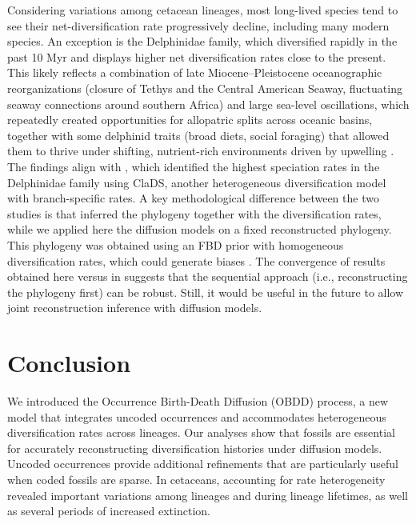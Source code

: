 \documentclass[oupdraft]{sysbio}
\newcommand{\revised}[1]{{\color{blue} #1}}
\begin{document}
Considering variations among cetacean lineages, most long-lived species tend to see their net-diversification rate progressively decline, including many modern species. An exception is the Delphinidae family, which diversified rapidly in the past 10 Myr and displays higher net diversification rates close to the present. This likely reflects a combination of late Miocene–Pleistocene oceanographic reorganizations (closure of Tethys and the Central American Seaway, fluctuating seaway connections around southern Africa) and large sea-level oscillations, which repeatedly created opportunities for allopatric splits across oceanic basins, together with some delphinid traits (broad diets, social foraging) that allowed them to thrive under shifting, nutrient-rich environments driven by upwelling \citep{gowans_social_2007, steeman_radiation_2009, do_amaral_historical_2018}. The findings align with \citet{barido-sottani_clads_2023}, which identified the highest speciation rates in the Delphinidae family using ClaDS, another heterogeneous diversification model with branch-specific rates. A key methodological difference between the two studies is that \citet{barido-sottani_clads_2023} inferred the phylogeny together with the diversification rates, while we applied here the diffusion models on a fixed reconstructed phylogeny. This phylogeny was obtained using an FBD prior with homogeneous diversification rates, which could generate biases \citep{barido-sottani_clads_2023}. The convergence of results obtained here versus in \citet{barido-sottani_clads_2023} suggests that the sequential approach (i.e., reconstructing the phylogeny first) can be robust. Still, it would be useful in the future to allow joint reconstruction inference with diffusion models.

\section{Conclusion}

We introduced the Occurrence Birth-Death Diffusion (OBDD) process, a new model that integrates \revised{uncoded} occurrences and accommodates heterogeneous diversification rates across lineages. Our analyses show that fossils are essential for accurately reconstructing diversification histories under diffusion models. \revised{Uncoded} occurrences provide additional refinements that are particularly useful when \revised{coded} fossils are sparse. In cetaceans, accounting for rate heterogeneity revealed important variations among lineages and during lineage lifetimes, as well as several periods of increased extinction.
\end{document}
